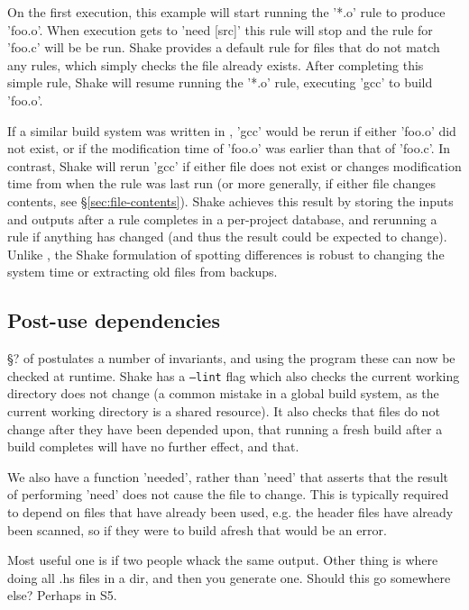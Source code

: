 On the first execution, this example will start running the \lst'*.o' rule to produce \lst'foo.o'. When execution gets to \lst'need [src]' this rule will stop and the rule for \lst'foo.c' will be be run. Shake provides a default rule for files that do not match any rules, which simply checks the file already exists. After completing this simple rule, Shake will resume running the \lst'*.o' rule, executing \lst'gcc' to build \lst'foo.o'.

If a similar build system was written in \make{}, \lst'gcc' would be rerun if either \lst'foo.o' did not exist, or if the modification time of \lst'foo.o' was earlier than that of \lst'foo.c'. In contrast, Shake will rerun \lst'gcc' if either file does not exist or changes modification time from when the rule was last run (or more generally, if either file changes contents, see \S\ref{sec:file-contents}). Shake achieves this result by storing the inputs and outputs after a rule completes in a per-project database, and rerunning a rule if anything has changed (and thus the result could be expected to change). Unlike \make{}, the Shake formulation of spotting differences is robust to changing the system time or extracting old files from backups.

\subsection{Post-use dependencies}

\S? of \cite{shake} postulates a number of invariants, and using the  program these can now be checked at runtime. Shake has a \texttt{--lint} flag which also checks the current working directory does not change (a common mistake in a global build system, as the current working directory is a shared resource). It also checks that files do not change after they have been depended upon, that running a fresh build after a build completes will have no further effect, and that.

We also have a function \lst'needed', rather than \lst'need' that asserts that the result of performing \lst'need' does not cause the file to change. This is typically required to depend on files that have already been used, e.g. the header files have already been scanned, so if they were to build afresh that would be an error.

Most useful one is if two people whack the same output. Other thing is where doing all .hs files in a dir, and then you generate one. Should this go somewhere else? Perhaps in S5.




